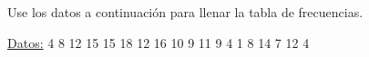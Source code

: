\documentclass{cdplf-prueba}
\begin{document}
\subsection{}

Use los datos a continuación para llenar la tabla de frecuencias.

\underline{Datos:} \hspace{4pt} 4 \hspace{4pt}\textbullet\hspace{4pt} 8 \hspace{4pt}\textbullet\hspace{4pt} 12 \hspace{4pt}\textbullet\hspace{4pt} 15 \hspace{4pt}\textbullet\hspace{4pt} 15 \hspace{4pt}\textbullet\hspace{4pt} 18 \hspace{4pt}\textbullet\hspace{4pt} 12 \hspace{4pt}\textbullet\hspace{4pt} 16 \hspace{4pt}\textbullet\hspace{4pt} 10 \hspace{4pt}\textbullet\hspace{4pt} 9 \hspace{4pt}\textbullet\hspace{4pt} 11 \hspace{4pt}\textbullet\hspace{4pt} 9 \hspace{4pt}\textbullet\hspace{4pt} 4 \hspace{4pt}\textbullet\hspace{4pt} 1 \hspace{4pt}\textbullet\hspace{4pt} 8 \hspace{4pt}\textbullet\hspace{4pt} 14 \hspace{4pt}\textbullet\hspace{4pt} 7 \hspace{4pt}\textbullet\hspace{4pt} 12 \hspace{4pt}\textbullet\hspace{4pt} 4
\end{document}
